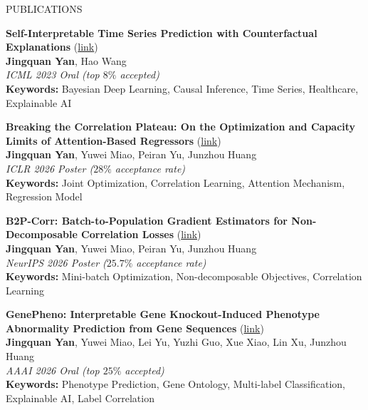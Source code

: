 \documentclass{resume} %
\begin{document}
\vspace{-4pt}
\begin{rSection}{PUBLICATIONS}

\begin{enumerate}[label={[\arabic*]}]


  \item \textbf{Self-Interpretable Time Series Prediction with Counterfactual Explanations} (\href{https://icml.cc/virtual/2023/oral/25470}{link}) \hfill \\
  \textbf{Jingquan Yan}, Hao Wang \hfill \\
  \textit{ICML 2023 Oral (top $8\%$ accepted)} \\
  \textbf{Keywords:} Bayesian Deep Learning, Causal Inference, Time Series, Healthcare, Explainable AI

    \item \textbf{Breaking the Correlation Plateau: On the Optimization and Capacity Limits of Attention-Based Regressors} (\href{https://openreview.net/forum?id=hcKK5F6Hlf}{link}) \hfill \\
  \textbf{Jingquan Yan}, Yuwei Miao, Peiran Yu, Junzhou Huang\hfill \\
  \textit{ICLR 2026 Poster ($28\%$ acceptance rate)}\\
    \textbf{Keywords:} Joint Optimization, Correlation Learning, Attention Mechanism, Regression Model
    
    \item \textbf{B2P-Corr: Batch-to-Population Gradient Estimators for Non-Decomposable Correlation Losses} (\href{https://TODO_after_camera_ready}{link}) \hfill \\
  \textbf{Jingquan Yan}, Yuwei Miao, Peiran Yu, Junzhou Huang\hfill \\
  \textit{NeurIPS 2026 Poster ($25.7\%$ acceptance rate)}\\
    \textbf{Keywords:} Mini-batch Optimization, Non-decomposable Objectives, Correlation Learning

  \item \textbf{GenePheno: Interpretable Gene Knockout-Induced Phenotype Abnormality Prediction from Gene Sequences} (\href{https://arxiv.org/abs/2511.09512}{link}) \hfill \\
  \textbf{Jingquan Yan}, Yuwei Miao, Lei Yu, Yuzhi Guo, Xue Xiao, Lin Xu, Junzhou Huang\hfill \\
  \textit{AAAI 2026 Oral (top $25\%$ accepted)} \\
  \textbf{Keywords:} Phenotype Prediction, Gene Ontology, Multi-label Classification, Explainable AI, Label Correlation


\end{enumerate}
\end{rSection}
\end{document}
